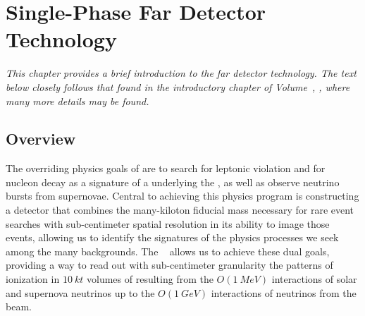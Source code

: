 \chapter{Single-Phase Far Detector Technology}
\label{ch:exec-sp}

\textit{This chapter provides a brief introduction to the  far detector technology.  The text below closely follows that found in the introductory chapter of Volume~\volnumbersp{}, \voltitlesp{}, where many more details may be found.}

\section{Overview}
\label{sec:exec-sp-over}

The overriding physics goals of  are to search for leptonic  violation and for nucleon decay as a signature of a  underlying the , as well as observe neutrino bursts from supernovae. Central to achieving this physics program is constructing a detector that combines the many-kiloton fiducial mass necessary for rare event searches with sub-centimeter spatial resolution in its ability to image those events, allowing us to identify the signatures of the physics processes we seek among the many backgrounds. The  ~\cite{Rubbia:1977zz} allows us to achieve these dual goals, providing a way to read out with sub-centimeter granularity the patterns of ionization in $\SI{10}{kt}$ volumes of  resulting from the $O(\SI{1}{MeV})$ interactions of solar and supernova neutrinos up to the $O(\SI{1}{GeV})$ interactions of neutrinos from the  beam.

